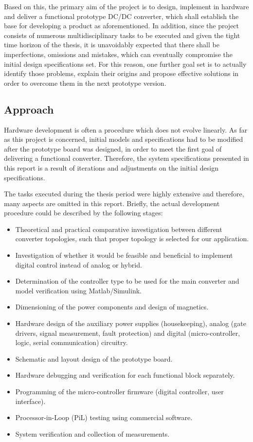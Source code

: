 Based on this, the primary aim of the project is to design, implement in hardware and deliver a functional prototype DC/DC converter, which shall establish the base for developing a product as aforementioned. In addition, since the project consists of numerous multidisciplinary tasks to be executed and given the tight time horizon of the thesis, it is unavoidably expected that there shall be imperfections, omissions and mistakes, which can eventually compromise the initial design specifications set. For this reason, one further goal set is to actually identify those problems, explain their origins and propose effective solutions in order to overcome them in the next prototype version.

\subsection{Approach}

Hardware development is often a procedure which does not evolve linearly. As far as this project is concerned, initial models and specifications had to be modified after the prototype board was designed, in order to meet the first goal of delivering a functional converter. Therefore, the system specifications presented in this report is a result of iterations and adjustments on the initial design specifications.

The tasks executed during the thesis period were highly extensive and therefore, many aspects are omitted in this report. Briefly, the actual development procedure could be described by the following stages:

\begin{itemize}
    \item Theoretical and practical comparative investigation between different converter topologies, such that proper topology is selected for our application.
    \item Investigation of whether it would be feasible and beneficial to implement digital control instead of analog or hybrid.
    \item Determination of the controller type to be used for the main converter and model verification using Matlab/Simulink.
    \item Dimensioning of the power components and design of magnetics.
    \item Hardware design of the auxiliary power supplies (housekeeping), analog (gate drivers, signal measurement, fault protection) and digital (micro-controller, logic, serial communication) circuitry.
    \item Schematic and layout design of the prototype board.
    \item Hardware debugging and verification for each functional block separately.
    \item Programming of the micro-controller firmware (digital controller, user interface).
    \item Processor-in-Loop (PiL) testing using commercial software.
    \item System verification and collection of measurements.
    \end{itemize}
    
